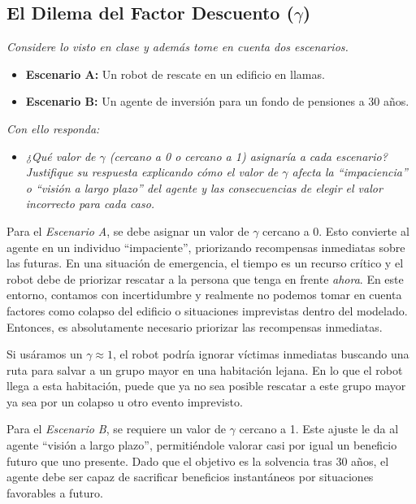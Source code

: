 \documentclass[11pt]{article}
\begin{document}
\subsection*{El Dilema del Factor Descuento ($\gamma$)}
\noindent\textit{Considere lo visto en clase y además tome en cuenta dos escenarios.}

\begin{itemize}
  \item\textbf{Escenario A:} Un robot de rescate en un edificio en llamas.
  \item\textbf{Escenario B:} Un agente de inversión para un fondo de pensiones a 30 años.
\end{itemize}

\textit{Con ello responda:}

\begin{itemize}
  \item \textit{¿Qué valor de $\gamma$ (cercano a 0 o cercano a 1) asignaría a cada escenario? Justifique su respuesta
  explicando cómo el valor de $\gamma$ afecta la ``impaciencia'' o ``visión a largo plazo'' del agente y las
  consecuencias de elegir el valor incorrecto para cada caso.}
\end{itemize}

\noindent Para el \textit{Escenario A}, se debe asignar un valor de $\gamma$ cercano a 0. Esto convierte al agente en un individuo 
``impaciente'', priorizando recompensas inmediatas sobre las futuras. En una situación de emergencia, el tiempo es un recurso crítico y
el robot debe de priorizar rescatar a la persona que tenga en frente \textit{ahora}. En este entorno, contamos con incertidumbre y
realmente no podemos tomar en cuenta factores como colapso del edificio o situaciones imprevistas dentro del modelado. Entonces, es 
absolutamente necesario priorizar las recompensas inmediatas.

\vspace{0.5em}

\noindent Si usáramos un $\gamma \approx 1$, el robot podría ignorar víctimas inmediatas buscando una ruta
para salvar a un grupo mayor en una habitación lejana. En lo que el robot llega a esta habitación, puede que ya no sea posible
rescatar a este grupo mayor ya sea por un colapso u otro evento imprevisto.

\vspace{0.5em}

\noindent Para el \textit{Escenario B}, se requiere un valor de $\gamma$ cercano a 1. Este ajuste le da al agente 
``visión a largo plazo'', permitiéndole valorar casi por igual un beneficio futuro que uno presente. Dado que el objetivo es
la solvencia tras 30 años, el agente debe ser capaz de sacrificar beneficios instantáneos por situaciones favorables a futuro.
\end{document}
